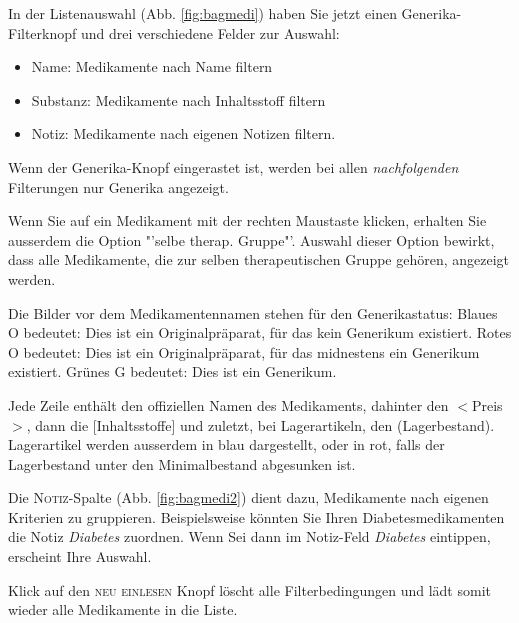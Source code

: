 \documentclass[a4paper]{scrartcl}
\begin{document}
In der Listenauswahl (Abb. \ref{fig:bagmedi}) haben Sie jetzt einen Generika-Filterknopf und drei verschiedene Felder zur Auswahl:
\begin{itemize}
    \item Name: Medikamente nach Name filtern
    \item Substanz: Medikamente nach Inhaltsstoff filtern
    \item Notiz: Medikamente nach eigenen Notizen filtern.
\end{itemize}
Wenn der Generika-Knopf eingerastet ist, werden bei allen \textit{nachfolgenden} Filterungen nur Generika angezeigt.

\medskip

Wenn Sie auf ein Medikament mit der rechten Maustaste klicken, erhalten Sie ausserdem die Option "'selbe therap. Gruppe"'. Auswahl dieser Option bewirkt, dass alle Medikamente, die zur selben therapeutischen Gruppe gehören, angezeigt werden.

Die Bilder vor dem Medikamentennamen stehen für den Generikastatus: Blaues O bedeutet: Dies ist ein Originalpräparat, für das kein Generikum existiert. Rotes O bedeutet: Dies ist ein Originalpräparat, für das midnestens ein Generikum existiert. Grünes G bedeutet: Dies ist ein Generikum.

 Jede Zeile enthält den offiziellen Namen des Medikaments, dahinter den $<$Preis$>$, dann die [Inhaltsstoffe] und zuletzt, bei Lagerartikeln, den (Lagerbestand). Lagerartikel werden ausserdem in blau dargestellt, oder in rot, falls der Lagerbestand unter den Minimalbestand abgesunken ist.

\medskip

Die \textsc{Notiz}-Spalte (Abb. \ref{fig:bagmedi2}) dient dazu, Medikamente nach eigenen Kriterien zu gruppieren. Beispielsweise könnten Sie \glqq{}Ihren\grqq{} Diabetesmedikamenten die Notiz \textit{Diabetes} zuordnen. Wenn Sei dann im Notiz-Feld \textit{Diabetes} eintippen, erscheint Ihre Auswahl.

\medskip

Klick auf den \textsc{neu einlesen} Knopf löscht alle Filterbedingungen und lädt somit wieder alle Medikamente in die Liste.
\end{document}
